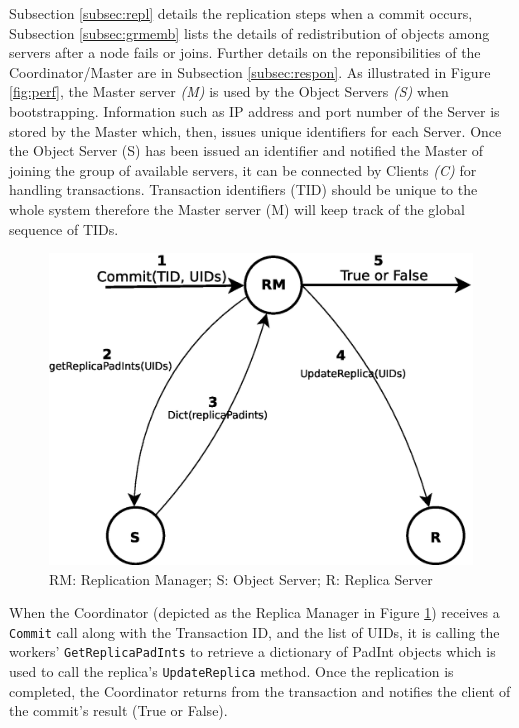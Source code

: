 \documentclass[times, 10pt,twocolumn]{article}
\begin{document}
Subsection \ref{subsec:repl} details the replication steps when a commit occurs, Subsection \ref{subsec:grmemb} lists the details of redistribution of objects among servers after a node fails or joins. Further details on the reponsibilities of the Coordinator/Master are in Subsection \ref{subsec:respon}.
\label{subsec:repl}
As illustrated in Figure \ref{fig:perf}, the Master server {\it(M)} is used by the Object Servers {\it(S)} when bootstrapping. Information such as
IP address and port number of the Server is stored by the Master which, then, issues unique identifiers for each Server. Once the Object Server (S) has been issued an identifier and notified the Master of joining the group of available servers, it can be connected by Clients {\it(C)} for handling transactions. Transaction identifiers (TID) should be unique to the whole system therefore the Master server (M) will keep track of the global sequence of TIDs.

\begin{figure}
\centering
\includegraphics[scale=0.3]{replication.eps}
\caption{RM: Replication Manager; S: Object Server; R: Replica Server}
\label{fig:repl}
\end{figure}

When the Coordinator (depicted as the Replica Manager in Figure \ref{fig:repl}) receives a
\texttt{Commit} call along with the Transaction ID, and the list of UIDs, it is calling 
the workers' \texttt{GetReplicaPadInts} to retrieve a dictionary of PadInt objects which is used
to call the replica's \texttt{UpdateReplica} method. Once the replication is completed, the Coordinator
returns from the transaction and notifies the client of the commit's result (True or False).
\end{document}

